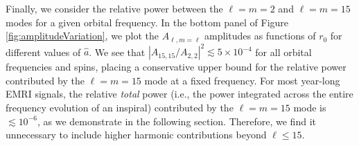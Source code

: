 \documentclass[%
 reprint,
 nofootinbib,
 amsmath,amssymb,
 aps,
 prd,
]{revtex4-2}
\begin{document}
Finally, we consider the relative power between the $\ell = m = 2$ and $\ell = m = 15$ modes for a given orbital frequency. In the bottom panel of Figure \ref{fig:amplitudeVariation}, we plot the $A_{\ell, m = \ell}$ amplitudes as functions of $r_0$ for different values of $\hat{a}$. We see that $|A_{15,15}/A_{2,2}|^2 \lesssim 5\times 10^{-4}$ for all orbital frequencies and spins, placing a conservative upper bound for the relative power contributed by the $\ell = m = 15$ mode at a fixed frequency. For most year-long EMRI signals, the relative \emph{total} power (i.e., the power integrated across the entire frequency evolution of an inspiral) contributed by the $\ell = m = 15$ mode is $\lesssim 10^{-6}$, as we demonstrate in the following section. Therefore, we find it unnecessary to include higher harmonic contributions beyond $\ell \leq 15$.
\end{document}
